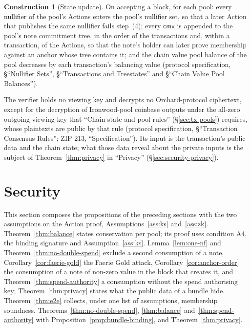 \documentclass[11pt,a4paper]{article}
\theoremstyle{definition}
\newtheorem{construction}[theorem]{Construction}
\newcommand{\cmx}{\mathsf{cmx}}
\begin{document}
\begin{construction}[State update]
On accepting a block, for each pool: every nullifier of the pool's Actions
enters the pool's nullifier set, so that a later Action that publishes the
same nullifier fails step~(4); every $\cmx$ is appended to the pool's note
commitment tree, in the order of the transactions and, within a
transaction, of the Actions, so that the note's holder can later prove
membership against an anchor whose tree contains it; and the chain value
pool balance of the pool decreases by each transaction's balancing value
(protocol specification, \S``Nullifier Sets'', \S``Transactions and
Treestates'' and \S``Chain Value Pool Balances'').
\end{construction}

The verifier holds no viewing key and decrypts no Orchard-protocol
ciphertext, except for the decryption of Ironwood-pool coinbase outputs
under the all-zero outgoing viewing key that ``Chain state and pool rules''
(\S\ref{sec:tx-pools}) requires, whose plaintexts are public by that rule
(protocol specification, \S``Transaction Consensus Rules''; ZIP 213,
``Specification''). Its input is the transaction's public data and the chain
state; what those data reveal about the private inputs is the subject of
Theorem~\ref{thm:privacy} in ``Privacy'' (\S\ref{sec:security-privacy}).

\section{Security}\label{sec:security}

This section composes the propositions of the preceding sections with the
two assumptions on the Action proof, Assumptions~\ref{ass:ks}
and~\ref{ass:zk}. Theorem~\ref{thm:balance} states conservation per pool;
its proof uses condition A4, the binding signature and
Assumption~\ref{ass:ks}. Lemma~\ref{lem:one-nf} and
Theorem~\ref{thm:no-double-spend} exclude a second consumption of a note,
Corollary~\ref{cor:faerie-gold} the Faerie Gold attack,
Corollary~\ref{cor:anchor-order} the consumption of a note of non-zero value
in the block that creates it, and
Theorem~\ref{thm:spend-authority} a consumption without the spend
authorising key; Theorem~\ref{thm:privacy} states what the public data of a
bundle hide. Theorem~\ref{thm:e2e} collects, under one list of assumptions,
membership soundness, Theorems~\ref{thm:no-double-spend}, \ref{thm:balance}
and~\ref{thm:spend-authority} with Proposition~\ref{prop:bundle-binding},
and Theorem~\ref{thm:privacy}.
\end{document}

